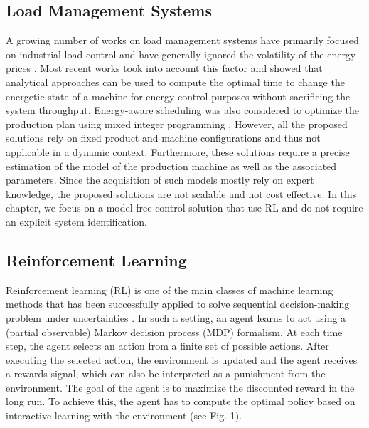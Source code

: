 \subsection{Load Management Systems}

A growing number of works on load management systems have primarily focused on industrial load control and have generally ignored the volatility of the energy prices \cite{Gholian7236921, CHEN2015263, Wang6345296, MIDDELBERG20091266}. Most recent works \cite{Sun6329376, DUFLOU2012587, Pechmann2011} took into account this factor and showed that analytical approaches can be used to compute the optimal time to change the energetic state of a machine for energy control purposes without sacrificing the system throughput. Energy-aware scheduling was also considered to optimize the production plan using mixed integer programming \cite{BRUZZONE2012459, FANG2011234}. However, all the proposed solutions rely on fixed product and machine configurations and thus not applicable in a dynamic context. Furthermore, these solutions require a precise estimation of the model of the production machine as well as the associated parameters. Since the acquisition of such models mostly rely on expert knowledge, the proposed solutions are not scalable and not cost effective. In this chapter, we focus on a model-free control solution that use RL and do not require an explicit system identification.

\subsection{Reinforcement Learning}
Reinforcement learning (RL) is one of the main classes of machine learning methods that has been successfully applied to solve sequential decision-making problem under uncertainties \cite{Liu6918520}. In such a setting, an agent learns to act using a (partial observable) Markov decision process (MDP) \cite{Sutton9780262039246} formalism. At each time step, the agent selects an action from a finite set of possible actions. After executing the selected action, the environment is updated and the agent receives a rewards signal, which can also be interpreted as a punishment from the environment. The goal of the agent is to maximize the discounted reward in the long run. To achieve this, the agent has to compute the optimal policy based on interactive learning with the environment (see Fig. 1).

